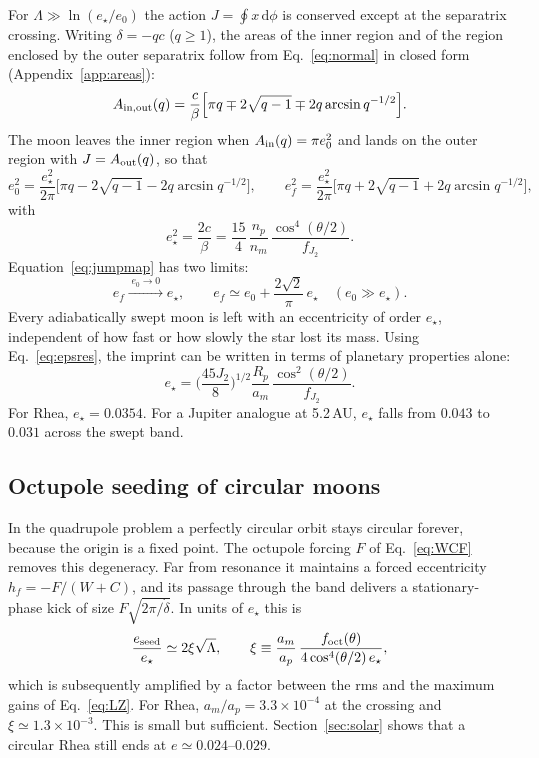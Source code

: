 \documentclass[11pt,a4paper]{article}
\newcommand{\estar}{e_\star}
\newcommand{\fJ}{f_{J_2}}
\newcommand{\foct}{f_{\rm oct}}
\newcommand{\dd}{\mathrm{d}}
\begin{document}
For $\Lambda\gg\ln(\estar/e_0)$ the action $J=\oint x\,\dd\phi$ is conserved except at the separatrix crossing. Writing $\delta=-qc$ ($q\ge1$), the areas of the inner region and of the region enclosed by the outer separatrix follow from Eq.~\eqref{eq:normal} in closed form (Appendix~\ref{app:areas}):
\begin{equation}
A_{\rm in,out}(q)=\frac{c}{\beta}\Big[\pi q\mp2\sqrt{q-1}\mp2q\arcsin q^{-1/2}\Big].
\label{eq:areas}
\end{equation}
The moon leaves the inner region when $A_{\rm in}(q)=\pi e_0^2$ and lands on the outer region with $J=A_{\rm out}(q)$, so that
\begin{equation}
e_0^2=\frac{\estar^2}{2\pi}\Big[\pi q-2\sqrt{q-1}-2q\arcsin q^{-1/2}\Big],\qquad
e_f^2=\frac{\estar^2}{2\pi}\Big[\pi q+2\sqrt{q-1}+2q\arcsin q^{-1/2}\Big],
\label{eq:jumpmap}
\end{equation}
with
\begin{equation}
\estar^2=\frac{2c}{\beta}=\frac{15}{4}\,\frac{n_p}{n_m}\,\frac{\cos^4(\theta/2)}{\fJ}.
\label{eq:estar}
\end{equation}
Equation~\eqref{eq:jumpmap} has two limits:
\begin{equation}
e_f\xrightarrow{\;e_0\to0\;}\estar,\qquad e_f\simeq e_0+\frac{2\sqrt2}{\pi}\,\estar\quad(e_0\gg\estar).
\label{eq:limits}
\end{equation}
Every adiabatically swept moon is left with an eccentricity of order $\estar$, independent of how fast or how slowly the star lost its mass. Using Eq.~\eqref{eq:epsres}, the imprint can be written in terms of planetary properties alone:
\begin{equation}
\estar=\Big(\frac{45J_2}{8}\Big)^{1/2}\frac{R_p}{a_m}\,\frac{\cos^2(\theta/2)}{\fJ}.
\label{eq:estarJ2}
\end{equation}
For Rhea, $\estar=0.0354$. For a Jupiter analogue at 5.2\,AU, $\estar$ falls from $0.043$ to $0.031$ across the swept band.

\subsection{Octupole seeding of circular moons}\label{sec:octupole}

In the quadrupole problem a perfectly circular orbit stays circular forever, because the origin is a fixed point. The octupole forcing $F$ of Eq.~\eqref{eq:WCF} removes this degeneracy. Far from resonance it maintains a forced eccentricity $h_f=-F/(W+C)$, and its passage through the band delivers a stationary-phase kick of size $F\sqrt{2\pi/\dot\delta}$. In units of $\estar$ this is
\begin{equation}
\frac{e_{\rm seed}}{\estar}\simeq2\xi\sqrt{\Lambda},\qquad \xi\equiv\frac{a_m}{a_p}\,\frac{\foct(\theta)}{4\cos^4(\theta/2)\,\estar},
\label{eq:seed}
\end{equation}
which is subsequently amplified by a factor between the rms and the maximum gains of Eq.~\eqref{eq:LZ}. For Rhea, $a_m/a_p=3.3\times10^{-4}$ at the crossing and $\xi\simeq1.3\times10^{-3}$. This is small but sufficient. Section~\ref{sec:solar} shows that a circular Rhea still ends at $e\simeq0.024$--$0.029$.
\end{document}
